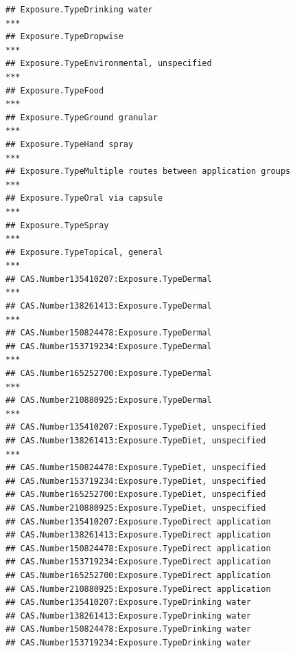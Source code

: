 \documentclass[
  12pt,
]{article}
\begin{document}
\begin{verbatim}
## Exposure.TypeDrinking water                                                 ***
## Exposure.TypeDropwise                                                       ***
## Exposure.TypeEnvironmental, unspecified                                     ***
## Exposure.TypeFood                                                           ***
## Exposure.TypeGround granular                                                ***
## Exposure.TypeHand spray                                                     ***
## Exposure.TypeMultiple routes between application groups                     ***
## Exposure.TypeOral via capsule                                               ***
## Exposure.TypeSpray                                                          ***
## Exposure.TypeTopical, general                                               ***
## CAS.Number135410207:Exposure.TypeDermal                                     ***
## CAS.Number138261413:Exposure.TypeDermal                                     ***
## CAS.Number150824478:Exposure.TypeDermal                                        
## CAS.Number153719234:Exposure.TypeDermal                                     ***
## CAS.Number165252700:Exposure.TypeDermal                                     ***
## CAS.Number210880925:Exposure.TypeDermal                                     ***
## CAS.Number135410207:Exposure.TypeDiet, unspecified                             
## CAS.Number138261413:Exposure.TypeDiet, unspecified                          ***
## CAS.Number150824478:Exposure.TypeDiet, unspecified                             
## CAS.Number153719234:Exposure.TypeDiet, unspecified                             
## CAS.Number165252700:Exposure.TypeDiet, unspecified                             
## CAS.Number210880925:Exposure.TypeDiet, unspecified                             
## CAS.Number135410207:Exposure.TypeDirect application                            
## CAS.Number138261413:Exposure.TypeDirect application                            
## CAS.Number150824478:Exposure.TypeDirect application                            
## CAS.Number153719234:Exposure.TypeDirect application                            
## CAS.Number165252700:Exposure.TypeDirect application                            
## CAS.Number210880925:Exposure.TypeDirect application                            
## CAS.Number135410207:Exposure.TypeDrinking water                                
## CAS.Number138261413:Exposure.TypeDrinking water                                
## CAS.Number150824478:Exposure.TypeDrinking water                                
## CAS.Number153719234:Exposure.TypeDrinking water                                

\end{verbatim}
\end{document}
